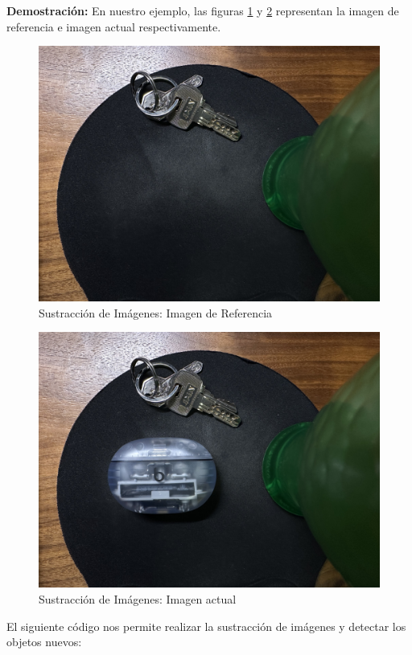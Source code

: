 \documentclass[12pt,letterpaper]{article}
\begin{document}
\textbf{Demostración:} En nuestro ejemplo, las figuras \ref{fig:sustraccion_referencia} y \ref{fig:sustraccion_actual} representan la imagen de referencia e imagen actual respectivamente.

\begin{figure}[H]
  \centering
  \includegraphics[width=0.5\linewidth]{../data/data-substraction-sample/img-1.jpg}
  \caption{Sustracción de Imágenes: Imagen de Referencia}
  \label{fig:sustraccion_referencia}
\end{figure}

\begin{figure}[H]
  \centering
  \includegraphics[width=0.5\linewidth]{../data/data-substraction-sample/img-2.jpg}
  \caption{Sustracción de Imágenes: Imagen actual}
  \label{fig:sustraccion_actual}
\end{figure}

El siguiente código nos permite realizar la sustracción de imágenes y detectar los objetos nuevos:
\end{document}

